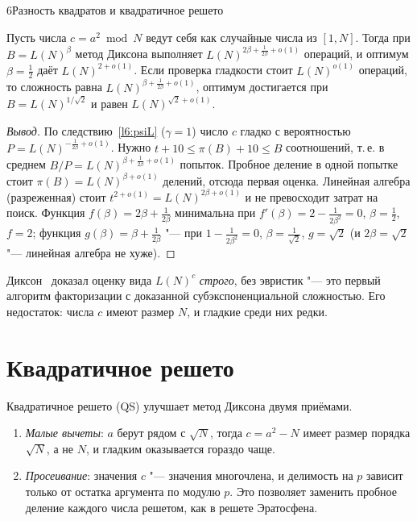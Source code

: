 \begin{lecture}{6}{Разность квадратов и квадратичное решето}
\begin{theorem}\label{l6:dixon}
Пусть числа $c = a^2 \bmod N$ ведут себя как случайные числа из $[1, N]$. Тогда при
$B = L(N)^{\beta}$ метод Диксона выполняет $L(N)^{2\beta + \frac{1}{2\beta} + o(1)}$ операций,
и оптимум $\beta = \frac12$ даёт $L(N)^{2 + o(1)}$. Если проверка гладкости стоит $L(N)^{o(1)}$
операций, то сложность равна $L(N)^{\beta + \frac{1}{2\beta} + o(1)}$, оптимум достигается при
$B = L(N)^{1/\sqrt2}$ и равен $L(N)^{\sqrt 2 + o(1)}$.
\end{theorem}

\begin{proof}[Вывод]
По следствию~\ref{l6:psiL} ($\gamma = 1$) число $c$ гладко с вероятностью
$P = L(N)^{-\frac{1}{2\beta} + o(1)}$. Нужно $t + 10 \le \pi(B) + 10 \le B$ соотношений, т.\,е.
в среднем $B / P = L(N)^{\beta + \frac{1}{2\beta} + o(1)}$ попыток. Пробное деление в одной
попытке стоит $\pi(B) = L(N)^{\beta + o(1)}$ делений, отсюда первая оценка. Линейная алгебра
(разреженная) стоит $t^{2 + o(1)} = L(N)^{2\beta + o(1)}$ и не превосходит затрат на поиск.
Функция $f(\beta) = 2\beta + \frac{1}{2\beta}$ минимальна при $f'(\beta) = 2 - \frac{1}{2\beta^2} = 0$,
$\beta = \frac12$, $f = 2$; функция $g(\beta) = \beta + \frac{1}{2\beta}$ "--- при
$1 - \frac{1}{2\beta^2} = 0$, $\beta = \frac{1}{\sqrt2}$, $g = \sqrt2$ (и $2\beta = \sqrt 2$ "---
линейная алгебра не хуже).
\end{proof}

Диксон~\cite{dixon} доказал оценку вида $L(N)^{c}$ \emph{строго}, без эвристик "--- это первый
алгоритм факторизации с доказанной субэкспоненциальной сложностью. Его недостаток: числа $c$ имеют
размер $N$, и гладкие среди них редки.

\section{Квадратичное решето}

Квадратичное решето (QS) улучшает метод Диксона двумя приёмами.
\begin{enumerate}
  \item \emph{Малые вычеты}: $a$ берут рядом с $\sqrt N$, тогда $c = a^2 - N$ имеет размер
    порядка $\sqrt N$, а не $N$, и гладким оказывается гораздо чаще.
  \item \emph{Просеивание}: значения $c$ "--- значения многочлена, и делимость на $p$ зависит
    только от остатка аргумента по модулю $p$. Это позволяет заменить пробное деление
    каждого числа решетом, как в решете Эратосфена.
\end{enumerate}


\end{lecture}
